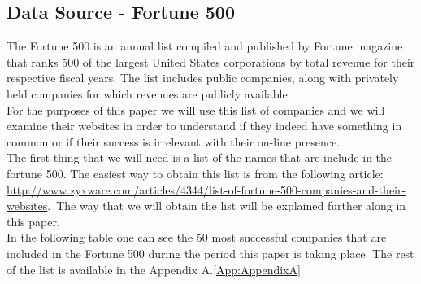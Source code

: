 \documentclass{article}
\begin{document}
\subsection{Data Source - Fortune 500}
The Fortune 500 is an annual list compiled and published by Fortune magazine that ranks 500 of the largest United States corporations by total revenue for their respective fiscal years. The list includes public companies, along with privately held companies for which revenues are publicly available.\cite{key1, key2}\\ 
For the purposes of this paper we will use this list of companies and we will examine their websites in order to understand if they indeed have something in common or if their success is irrelevant with their on-line presence.\\
The first thing that we will need is a list of the names that are include in the fortune 500. The easiest way to obtain this list is from the following article:
\href{url}{http://www.zyxware.com/articles/4344/list-of-fortune-500-companies-and-their-websites}.\ The way that we will obtain the list will be explained further along in this paper.\\
In the following table one can see the 50 most successful companies that are included in the Fortune 500 during the period this paper is taking place. The rest of the list is available in the Appendix A.\ref{App:AppendixA}
\end{document}
